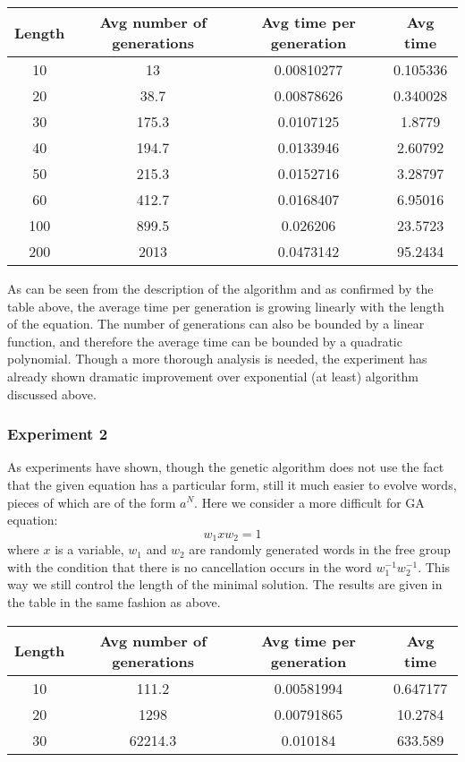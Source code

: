\documentclass{article}
\begin{document}
\vspace{8mm}
\noindent
\begin{tabular}{|c|c|c|c|} \hline
Length & Avg number of generations & Avg time per generation & Avg time \\ 
\hline
10 & 13 & 0.00810277 & 0.105336 \\ \hline
20 & 38.7 & 0.00878626 & 0.340028 \\ \hline
30 & 175.3 & 0.0107125 & 1.8779 \\ \hline
40 & 194.7 & 0.0133946 & 2.60792 \\ \hline
50 & 215.3 & 0.0152716 & 3.28797 \\ \hline
60 & 412.7 & 0.0168407 & 6.95016 \\ \hline
100 & 899.5 & 0.026206 & 23.5723 \\ \hline
200 & 2013 & 0.0473142 & 95.2434 \\ \hline
\end{tabular}
\vspace{8mm}

As can be seen from the description of the algorithm and as confirmed
by the table above, the average time per generation is growing
linearly with the length of the equation. The number of generations
can also be bounded by a linear function, and therefore the average
time can be bounded by a quadratic polynomial. Though a more thorough
analysis is needed, the experiment has already shown dramatic
improvement over exponential (at least) algorithm discussed above.

  \subsubsection{Experiment 2}

As experiments have shown, though the genetic algorithm does not use
the fact that the given equation has a particular form, still it much
easier to evolve words, pieces of which are of the form $a^N$. Here we
consider a more difficult for GA equation:
\[
w_1 x w_2 = 1
\]
where $x$ is a variable, $w_1$ and $w_2$ are randomly generated words
in the free group with the condition that there is no cancellation
occurs in the word $w_1^{-1} w_2^{-1}$. This way we still control the
length of the minimal solution. The results are given in the table in
the same fashion as above.

\vspace{8mm}
\noindent
\begin{tabular}{|c|c|c|c|} \hline
Length & Avg number of generations & Avg time per generation & Avg time \\ 
\hline
10 & 111.2 & 0.00581994 & 0.647177 \\ \hline
20 & 1298 & 0.00791865 & 10.2784 \\ \hline
30 & 62214.3 & 0.010184 & 633.589 \\ \hline
\end{tabular}
\vspace{8mm}
\end{document}

